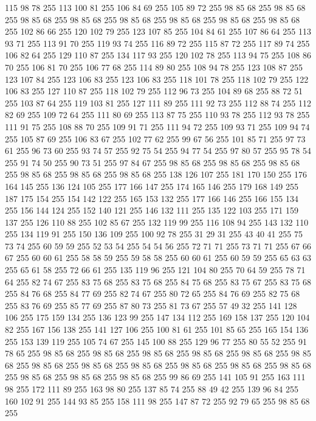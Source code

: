 115 98 78 255 113 100 81 255 106 84 69 255 105 89 72 255 98 85 68 255 98 85 68 255 98 85 68 255 98 85 68 255 98 85 68 255 98 85 68 255 98 85 68 255 98 85 68 255 102 86 66 255 120 102 79 255 123 107 85 255 104 84 61 255 107 86 64 255 113 93 71 255 113 91 70 255 119 93 74 255 116 89 72 255 115 87 72 255 117 89 74 255 106 82 64 255 129 110 87 255 134 117 93 255 120 102 78 255 113 94 75 255 108 86 70 255 106 81 70 255 106 77 68 255 114 89 80 255 108 94 78 255 123 108 87 255 123 107 84 255 123 106 83 255 123 106 83 255 118 101 78 255 118 102 79 255 122 106 83 255 127 110 87 255 118 102 79 255 112 96 73 255 104 89 68 255 88 72 51 255 103 87 64 255 119 103 81 255 127 111 89 255 111 92 73 255 112 88 74 255 112 82 69 255 109 72 64 255 111 80 69 255 113 87 75 255 110 93 78 255 112 93 78 255 111 91 75 255 108 88 70 255 109 91 71 255 111 94 72 255 109 93 71 255 109 94 74 255 105 87 69 255 106 83 67 255
102 77 62 255 99 67 56 255 101 85 71 255 97 73 61 255 96 73 60 255 93 74 57 255 92 75 54 255 94 77 54 255 97 80 57 255 95 78 54 255 91 74 50 255 90 73 51 255 97 84 67 255 98 85 68 255 98 85 68 255 98 85 68 255 98 85 68 255 98 85 68 255 98 85 68 255 138 126 107 255 181 170 150 255 176 164 145 255 136 124 105 255 177 166 147 255 174 165 146 255 179 168 149 255 187 175 154 255 154 142 122 255 165 153 132 255 177 166 146 255 166 155 134 255 156 144 124 255 152 140 121 255 146 132 111 255 135 122 103 255 171 159 137 255 126 110 88 255 102 85 67 255 132 119 99 255 116 108 94 255 143 132 110 255 134 119 91 255 150 136 109 255 100 92 78 255 31 29 31 255 43 40 41 255 75 73 74 255 60 59 59 255 52 53 54 255 54 54 56 255 72 71 71 255 73 71 71 255 67 66 67 255 60 60 61 255 58 58 59 255 59 58 58 255 60 60 61 255 60 59 59 255 65 63 63 255 65 61 58 255 72 66 61 255 135 119 96 255 121 104 80 255 70 64 59 255
78 71 64 255 82 74 67 255 83 75 68 255 83 75 68 255 84 75 68 255 83 75 67 255 83 75 68 255 84 76 68 255 84 77 69 255 82 74 67 255 80 72 65 255 84 76 69 255 82 75 68 255 83 76 69 255 85 77 69 255 87 80 73 255 81 73 67 255 57 49 32 255 141 128 106 255 175 159 134 255 136 123 99 255 147 134 112 255 169 158 137 255 120 104 82 255 167 156 138 255 141 127 106 255 100 81 61 255 101 85 65 255 165 154 136 255 153 139 119 255 105 74 67 255 145 100 88 255 129 96 77 255 80 55 52 255 91 78 65 255 98 85 68 255 98 85 68 255 98 85 68 255 98 85 68 255 98 85 68 255 98 85 68 255 98 85 68 255 98 85 68 255 98 85 68 255 98 85 68 255 98 85 68 255 98 85 68 255 98 85 68 255 98 85 68 255 98 85 68 255 99 86 69 255 141 105 91 255 163 111 98 255 172 111 89 255 163 98 80 255 137 85 74 255 88 49 42 255 139 96 84 255 160 102 91 255 144 93 85 255 158 111 98 255 147 87 72 255 92 79 65 255 98 85 68 255
